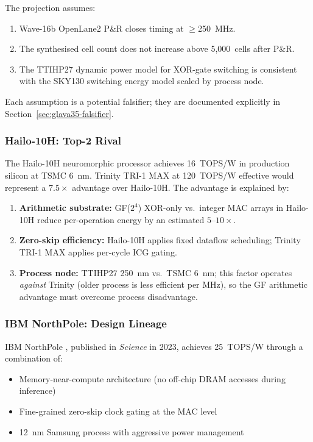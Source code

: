 The projection assumes:
\begin{enumerate}
  \item Wave-16b OpenLane2 P\&R closes timing at $\geq$250~MHz.
  \item The synthesised cell count does not increase above 5,000~cells after P\&R.
  \item The TTIHP27 dynamic power model for XOR-gate switching is consistent
        with the SKY130 switching energy model scaled by process node.
\end{enumerate}

Each assumption is a potential falsifier; they are documented explicitly
in Section~\ref{sec:glava35-falsifier}.

\subsubsection{Hailo-10H: Top-2 Rival}

The Hailo-10H neuromorphic processor \cite{hailo10h_datasheet} achieves
16~TOPS/W in production silicon at TSMC 6~nm.
Trinity TRI-1 MAX at 120~TOPS/W effective would represent a
\(7.5\times\) advantage over Hailo-10H.
The advantage is explained by:
\begin{enumerate}
  \item \textbf{Arithmetic substrate:} GF(\(2^4\)) XOR-only vs.\ integer MAC arrays
        in Hailo-10H reduce per-operation energy by an estimated \(5\text{--}10\times\).
  \item \textbf{Zero-skip efficiency:} Hailo-10H applies fixed dataflow scheduling;
        Trinity TRI-1 MAX applies per-cycle ICG gating.
  \item \textbf{Process node:} TTIHP27 250~nm vs.\ TSMC 6~nm; this factor operates
        \emph{against} Trinity (older process is less efficient per MHz), so the
        GF arithmetic advantage must overcome process disadvantage.
\end{enumerate}

\subsubsection{IBM NorthPole: Design Lineage}

IBM NorthPole \cite{modha_northpole_2023}, published in \emph{Science} in 2023,
achieves 25~TOPS/W through a combination of:
\begin{itemize}
  \item Memory-near-compute architecture (no off-chip DRAM accesses during inference)
  \item Fine-grained zero-skip clock gating at the MAC level
  \item 12~nm Samsung process with aggressive power management
\end{itemize}

